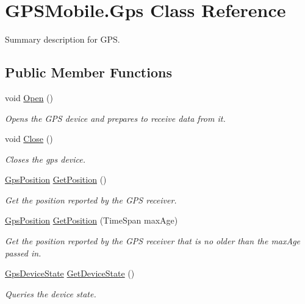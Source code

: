 \hypertarget{class_g_p_s_mobile_1_1_gps}{
\section{GPSMobile.Gps Class Reference}
\label{class_g_p_s_mobile_1_1_gps}
}


Summary description for GPS.  
\subsection*{Public Member Functions}
\begin{DoxyCompactItemize}
\item 
void \hyperlink{class_g_p_s_mobile_1_1_gps_aa8cd40ebf0327a9735912a27113621f2}{Open} ()
\begin{DoxyCompactList}\small\item\em Opens the GPS device and prepares to receive data from it. \item\end{DoxyCompactList}\item 
void \hyperlink{class_g_p_s_mobile_1_1_gps_a5de6d1f72d12b75a4407d200edba2259}{Close} ()
\begin{DoxyCompactList}\small\item\em Closes the gps device. \item\end{DoxyCompactList}\item 
\hyperlink{class_g_p_s_mobile_1_1_gps_position}{GpsPosition} \hyperlink{class_g_p_s_mobile_1_1_gps_a649e743e090756fd725666cfc3daf4fa}{GetPosition} ()
\begin{DoxyCompactList}\small\item\em Get the position reported by the GPS receiver. \item\end{DoxyCompactList}\item 
\hyperlink{class_g_p_s_mobile_1_1_gps_position}{GpsPosition} \hyperlink{class_g_p_s_mobile_1_1_gps_ac984add12f07f111aa65d115251d9f89}{GetPosition} (TimeSpan maxAge)
\begin{DoxyCompactList}\small\item\em Get the position reported by the GPS receiver that is no older than the maxAge passed in. \item\end{DoxyCompactList}\item 
\hyperlink{class_g_p_s_mobile_1_1_gps_device_state}{GpsDeviceState} \hyperlink{class_g_p_s_mobile_1_1_gps_aeff3c031b36f7322c81050480351f667}{GetDeviceState} ()
\begin{DoxyCompactList}\small\item\em Queries the device state. \item\end{DoxyCompactList}\end{DoxyCompactItemize}

